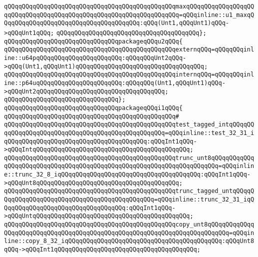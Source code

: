 \verb|qQQqqQQqqQQqqQQqqQQqqQQqqQQqqQQqqQQqqQQqqQQqqQQqmaxqQQqqQQqqQQqqQQqqQQqqQQqqQQqqQQqqQQqqQQqqQQqqQQqqQQqqQQqqQQqqQQqqQQq=qQQqinline::u1_maxqQQqqQQqqQQqqQQqqQQqqQQqqQQqqQQqqQQqqQQq:qQQq(Unt1,qQQqUnt1)qQQq->qQQqUnt1qQQq;|\newline
\verb|qQQqqQQqqQQqqQQqqQQqqQQqqQQqqQQqqQQqqQQq};|\newline
\newline
\newline
\verb|qQQqqQQqqQQqqQQqqQQqqQQqqQQqqQQqpackageqQQqu2qQQq{|\newline
\verb|qQQqqQQqqQQqqQQqqQQqqQQqqQQqqQQqqQQqqQQqqQQqqQQqexternqQQq=qQQqqQQqinline::u64pqQQqqQQqqQQqqQQqqQQqqQQq:qQQqqQQqUnt2qQQq->qQQq(Unt1,qQQqUnt1)qQQqqQQqqQQqqQQqqQQqqQQqqQQqqQQqqQQq;|\newline
\verb|qQQqqQQqqQQqqQQqqQQqqQQqqQQqqQQqqQQqqQQqqQQqqQQqinternqQQq=qQQqqQQqinline::p64uqQQqqQQqqQQqqQQqqQQqqQQq:qQQqqQQq(Unt1,qQQqUnt1)qQQq->qQQqUnt2qQQqqQQqqQQqqQQqqQQqqQQqqQQqqQQqqQQq;|\newline
\verb|qQQqqQQqqQQqqQQqqQQqqQQqqQQqqQQq};|\newline
\newline
\newline
\verb|qQQqqQQqqQQqqQQqqQQqqQQqqQQqqQQqpackageqQQqi1qQQq{|\newline
\verb|qQQqqQQqqQQqqQQqqQQqqQQqqQQqqQQqqQQqqQQqqQQqqQQq#|\newline
\verb|qQQqqQQqqQQqqQQqqQQqqQQqqQQqqQQqqQQqqQQqqQQqqQQqtest_tagged_intqQQqqQQqqQQqqQQqqQQqqQQqqQQqqQQqqQQqqQQqqQQqqQQqqQQq=qQQqinline::test_32_31_iqQQqqQQqqQQqqQQqqQQqqQQqqQQqqQQqqQQqqQQq:qQQqInt1qQQq->qQQqIntqQQqqQQqqQQqqQQqqQQqqQQqqQQqqQQqqQQqqQQqqQQq;|\newline
\verb|qQQqqQQqqQQqqQQqqQQqqQQqqQQqqQQqqQQqqQQqqQQqqQQqtrunc_unt8qQQqqQQqqQQqqQQqqQQqqQQqqQQqqQQqqQQqqQQqqQQqqQQqqQQqqQQqqQQqqQQqqQQqqQQq=qQQqinline::trunc_32_8_iqQQqqQQqqQQqqQQqqQQqqQQqqQQqqQQqqQQqqQQq:qQQqInt1qQQq->qQQqUnt8qQQqqQQqqQQqqQQqqQQqqQQqqQQqqQQqqQQqqQQq;|\newline
\verb|qQQqqQQqqQQqqQQqqQQqqQQqqQQqqQQqqQQqqQQqqQQqqQQqtrunc_tagged_untqQQqqQQqqQQqqQQqqQQqqQQqqQQqqQQqqQQqqQQqqQQqqQQq=qQQqinline::trunc_32_31_iqQQqqQQqqQQqqQQqqQQqqQQqqQQqqQQqqQQq:qQQqInt1qQQq->qQQqUntqQQqqQQqqQQqqQQqqQQqqQQqqQQqqQQqqQQqqQQqqQQq;|\newline
\verb|qQQqqQQqqQQqqQQqqQQqqQQqqQQqqQQqqQQqqQQqqQQqqQQqcopy_unt8qQQqqQQqqQQqqQQqqQQqqQQqqQQqqQQqqQQqqQQqqQQqqQQqqQQqqQQqqQQqqQQqqQQqqQQqqQQq=qQQqinline::copy_8_32_iqQQqqQQqqQQqqQQqqQQqqQQqqQQqqQQqqQQqqQQqqQQq:qQQqUnt8qQQq->qQQqInt1qQQqqQQqqQQqqQQqqQQqqQQqqQQqqQQqqQQqqQQq;|\newline

